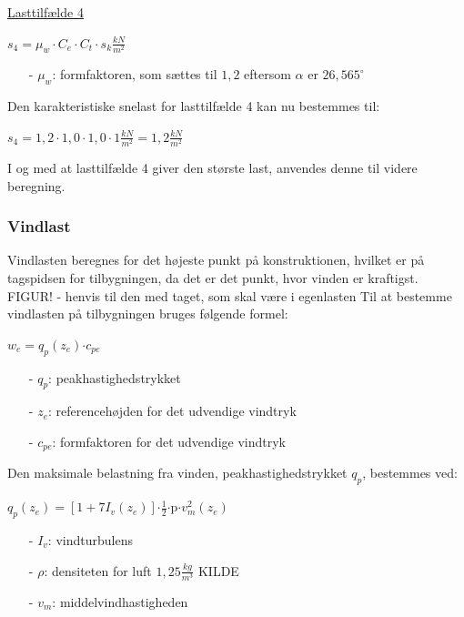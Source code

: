 \underline{Lasttilfælde 4}
\begin{center}
	$s_4=\mu_w\cdot C_e\cdot C_t\cdot s_k \frac{kN}{m^2}$
\end{center}
\begin{itemize}
	\item[-] $\mu_w$: formfaktoren, som sættes til $1,\!2$ eftersom $\alpha$ er $26,\!565^{\circ}$ \citep[ kapitel 5.3.3]{EU91}
\end{itemize}
Den karakteristiske snelast for lasttilfælde 4 kan nu bestemmes til:
\begin{center}
	$s_4=1,\!2\cdot 1,\!0\cdot 1,\!0\cdot 1 \frac{kN}{m^2}=1,\!2 \frac{kN}{m^2}$
\end{center}
I og med at lasttilfælde 4 giver den største last, anvendes denne til videre beregning.

\subsubsection{Vindlast}
Vindlasten beregnes for det højeste punkt på konstruktionen, hvilket er på tagspidsen for tilbygningen, da det er det punkt, hvor vinden er kraftigst.
\newline
\newline
FIGUR! - henvis til den med taget, som skal være i egenlasten
\newline
\newline
Til at bestemme vindlasten på tilbygningen bruges følgende formel:	
\begin{center} $w_e=q_p(z_e)$$\cdot$$c_{pe}$
\end{center}
\begin{itemize}
	\item[-] $q_p$: peakhastighedstrykket
	\item[-] $z_e$: referencehøjden for det udvendige vindtryk
	\item[-] $c_{pe}$: formfaktoren for det udvendige vindtryk
\end{itemize}
Den maksimale belastning fra vinden, peakhastighedstrykket $q_p$, bestemmes ved:
\begin{center}
$q_p(z_e)=[1+7I_v(z_e)]$$\cdot$$\frac{1}{2}$$\cdot$p$\cdot$$v_m^2(z_e)$
\end{center}
\begin{itemize}
	\item[-] $I_v$: vindturbulens
	\item[-] $\rho$: densiteten for luft $1,\!25 \frac{kg}{m^3}$ KILDE
	\item[-] $v_m$: middelvindhastigheden
\end{itemize}
